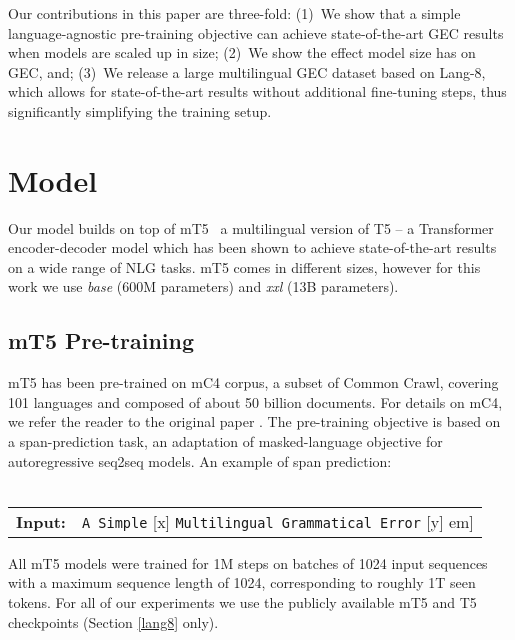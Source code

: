 \documentclass[11pt,a4paper]{article}
\begin{document}
Our contributions in this paper are three-fold: (1)~We show that a simple language-agnostic pre-training objective can achieve state-of-the-art GEC results when models are scaled up in size; (2)~We show the effect model size has on GEC, and; (3)~We release a large multilingual GEC dataset based on Lang-8, which allows for state-of-the-art results without additional fine-tuning steps, thus significantly simplifying the training setup.

\section{Model}
Our model builds on top of mT5~\citep{mt5} a multilingual version of T5 \citep{t5} -- a Transformer encoder-decoder model which has been shown to achieve state-of-the-art results on a wide range of NLG tasks. 
mT5 comes in different sizes, however for this work we use \emph{base} (600M parameters) and \emph{xxl} (13B parameters).

\subsection{mT5 Pre-training}\label{task-agnostic-pre-training}
mT5 has been pre-trained on mC4 corpus, a subset of Common Crawl, covering 101 languages and composed of about 50 billion documents. 
For details on mC4, we refer the reader to the original paper \citep{mt5}.
The pre-training objective is based on a span-prediction task, an adaptation of masked-language objective for autoregressive seq2seq models.
An example of span prediction:\\
\\
{\footnotesize
\setlength{\parindent}{3pt}
\begin{tabularx}{\columnwidth}{lX}
\textbf{Input:} & \texttt{A Simple} [x] \texttt{Multilingual Grammatical Error} [y] \1em]
\end{tabularx}
}

{\setlength{\parindent}{0pt}
 All mT5 models were trained for 1M steps on batches of 1024 input sequences with a maximum sequence length of 1024, corresponding to roughly 1T seen tokens.}
For all of our experiments we use the publicly available mT5 and T5 checkpoints (Section \ref{lang8} only).
\end{document}
